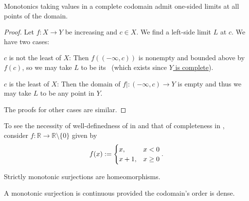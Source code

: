 	\begin{cor}\label{COR: one-sided lims of monotonics in a complete codom}
		Monotonics taking values in a complete codomain admit one-sided limits at all points of the domain.
	\end{cor}
	
	\begin{proof}
		Let $f\colon X\to Y$ be increasing and $c\in X$. We find a left-side limit $L$ at $c$. We have two cases:
		\begin{mylist}
			\item $c$ is not the least \elt of $X$: Then $f((-\infty, c))$ is nonempty and bounded above by $f(c)$, so we may take $L$ to be its \lub\ (which exists since \uline{$Y$ is complete}).
			
			\item $c$ is the least \elt of $X$: Then the domain of $f|\colon(-\infty, c)\to Y$ is empty and thus we may take $L$ to be any point in $Y$.
		\end{mylist}
		The proofs for other cases are similar.
	\end{proof}
	
	\begin{rmk}
		To see the necessity of well-definedness of \RHS in  and that of completeness in , consider $f\colon \mathbb R\to\mathbb R\setminus\{0\}$ given by
		\[
		f(x) := 
		\begin{cases}
			x, & x < 0\\
			x + 1, & x \ge 0
		\end{cases}\text.
		\]
	\end{rmk}
	
	
	\begin{prp}
		\leavevmode
		\begin{mylist}
			\item Strictly monotonic surjections are homeomorphisms.
			
			\item A monotonic surjection is continuous provided the codomain's order is dense.
		\end{mylist}
	\end{prp}
	
